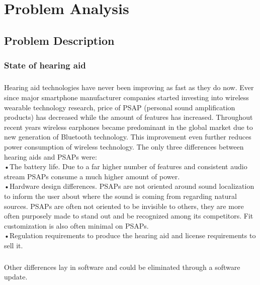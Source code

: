 \chapter{Problem Analysis}\label{ProblemAnalysis}
\section{Problem Description}
\subsection{State of hearing aid}
\paragraph{}
Hearing aid technologies have never been improving as fast as they do now. Ever since major smartphone manufacturer companies started investing into wireless wearable technology research, price of PSAP (personal sound amplification products) has decreased while the amount of features has increased. Throughout recent years wireless earphones became predominant in the global market due to new generation of Bluetooth technology. This improvement even further reduces power consumption of wireless technology. The only three differences between hearing aids and PSAPs were: \\

•The battery life. Due to a far higher number of features and consistent audio stream PSAPs consume a much higher amount of power.\\

•Hardware design differences. PSAPs are not oriented around sound localization to inform the user about where the sound is coming from regarding natural sources. PSAPs are often not oriented to be invisible to others, they are more often purposely made to stand out and be recognized among its competitors. Fit customization is also often minimal on PSAPs.\\

•Regulation requirements to produce the hearing aid and license requirements to sell it.

\paragraph{} 
Other differences lay in software and could be eliminated through a software update.
